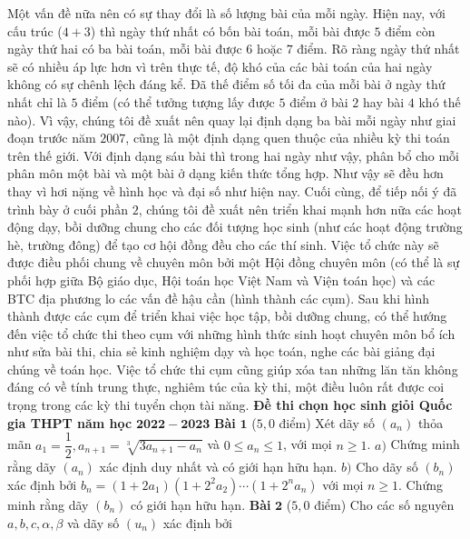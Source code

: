 \begin{multicols}{2}
	\vskip 0.1cm
	Một vấn đề nữa nên có sự thay đổi là số lượng bài của mỗi ngày. Hiện nay, với cấu trúc ($4+3$) thì ngày thứ nhất có bốn bài toán, mỗi bài được $5$ điểm còn ngày thứ hai có ba bài toán, mỗi bài được $6$ hoặc $7$ điểm. Rõ ràng ngày thứ nhất sẽ có nhiều áp lực hơn vì trên thực tế, độ khó của các bài toán của hai ngày không có sự chênh lệch đáng kể. Đã thế điểm số tối đa của mỗi bài ở ngày thứ nhất chỉ là $5$ điểm (có thể tưởng tượng lấy được $5$ điểm ở bài $2$ hay bài $4$ khó thế nào). Vì vậy, chúng tôi đề xuất nên quay lại định dạng ba bài mỗi ngày như giai đoạn trước năm $2007$, cũng là một định dạng quen thuộc của nhiều kỳ thi toán trên thế giới. Với định dạng sáu bài thì trong hai ngày như vậy, phân bổ cho mỗi phân môn một bài và một bài ở dạng kiến thức tổng hợp. Như vậy sẽ đều hơn thay vì hơi nặng về hình học và đại số như hiện nay. 
	\vskip 0.1cm
	Cuối cùng, để tiếp nối ý đã trình bày ở cuối phần $2$, chúng tôi đề xuất nên triển khai mạnh hơn nữa các hoạt động dạy, bồi dưỡng chung cho các đối tượng học sinh (như các hoạt động trường hè, trường đông) để tạo cơ hội đồng đều cho các thí sinh. Việc tổ chức này sẽ được điều phối chung về chuyên môn bởi một Hội đồng chuyên môn (có thể là sự phối hợp giữa Bộ giáo dục, Hội toán học Việt Nam và Viện toán học) và các BTC địa phương lo các vấn đề hậu cần (hình thành các cụm). 
	\vskip 0.1cm
	Sau khi hình thành được các cụm để triển khai việc học tập, bồi dưỡng chung, có thể hướng đến việc tổ chức thi theo cụm với những hình thức sinh hoạt chuyên môn bổ ích như sửa bài thi, chia sẻ kinh nghiệm dạy và học toán, nghe các bài giảng đại chúng về toán học. Việc tổ chức thi cụm cũng giúp xóa tan những lăn tăn không đáng có về tính trung thực, nghiêm túc của kỳ thi, một điều luôn rất được coi trọng trong các kỳ thi tuyển chọn tài năng. 
	\vskip 0.1cm
	\textbf{\color{cackithi}Đề thi chọn học sinh giỏi Quốc gia THPT năm học} $\pmb{2022-2023}$
	\vskip 0.1cm
	\textbf{\color{cackithi}Bài} $\pmb{1}$ ($5{,}0$ điểm) Xét dãy số $\left(a_n\right)$ thỏa mãn $a_1 = \dfrac{1}{2}, a_{n+1} = \sqrt[3]{3a_{n+1} - a_n}$ và $0 \le a_n \le 1$, với mọi $n \ge 1$.
	\vskip 0.1cm
	$a)$ Chứng minh rằng dãy $(a_n)$ xác định duy nhất và có giới hạn hữu hạn.
	\vskip 0.1cm
	$b)$ Cho dãy số $\left(b_n\right)$ xác định bởi $b_n = (1+ 2a_1)\left(1 + 2^2a_2\right)\cdots\left(1 + 2^na_n\right)$ với mọi $n \ge 1$. Chứng minh rằng dãy $\left(b_n\right)$ có giới hạn hữu hạn.
	\vskip 0.1cm
	\textbf{\color{cackithi}Bài} $\pmb{2}$ ($5{,}0$ điểm) Cho các số nguyên $a,b,c, \alpha,\beta$ và dãy số $\left(u_n\right)$ xác định bởi 
	\begin{align*}

\end{align*}
\end{multicols}
